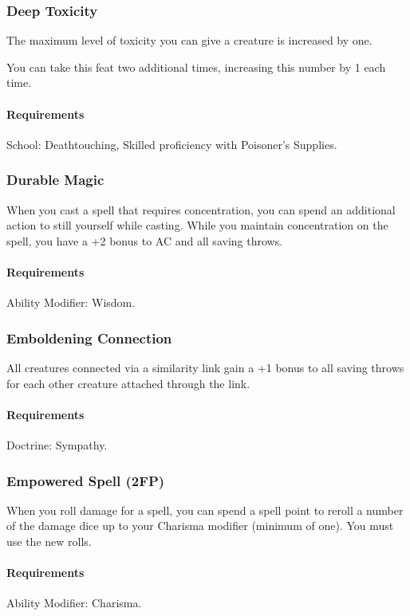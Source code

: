 \subsubsection{Deep Toxicity} \label{feat::deeptoxicity}
    The maximum level of toxicity you can give a creature is increased by one.

    You can take this feat two additional times, increasing this number by 1 each time.
    \paragraph{Requirements} School: Deathtouching, Skilled proficiency with Poisoner's Supplies.
\subsubsection{Durable Magic} \label{feat::durablemagic}
    When you cast a spell that requires concentration, you can spend an additional action to still yourself while casting.
    While you maintain concentration on the spell, you have a +2 bonus to AC and all saving throws.
    \paragraph{Requirements} Ability Modifier: Wisdom.
\subsubsection{Emboldening Connection} \label{feat::emboldeningconnection}
    All creatures connected via a similarity link gain a +1 bonus to all saving throws for each other creature attached through the link.
    \paragraph{Requirements} Doctrine: Sympathy.
\subsubsection{Empowered Spell (2FP)} \label{feat::empoweredspell}
    When you roll damage for a spell, you can spend a spell point to reroll a number of the damage dice up to your Charisma modifier (minimum of one).
    You must use the new rolls.
    \paragraph{Requirements} Ability Modifier: Charisma.
